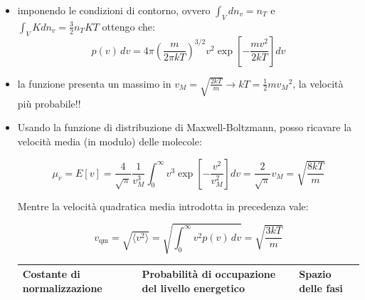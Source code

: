 \documentclass{article}
\theoremstyle{remark}
\begin{document}
\begin{itemize}
\begin{nota}
quindi per $\beta$ utilizzamo la definizone della media quadratica di tutte le velocità
\begin{align*}
    \langle v^2 \rangle &= \frac{1}{N} \int_0^\infty v^2 \, dn(v).
\end{align*}

Sostituendo l'espressione di \( dn(v) \), si ha

\begin{align*}
    \langle v^2 \rangle &= 4\pi A^3 \int_0^\infty v^4 \exp \left[ -\beta \left( \tfrac{1}{2} mv^2 \right) \right] dv
\end{align*}

Il cui valorè è:
$\frac{3}{m\beta}$

Dalle supposizioni abbiamo che l'unica energia è quella cinetica, dal teorema di equipartizione dell'energia, essendoci 3 gradi di libertà:

\[
    \tfrac{1}{2} m \langle w^2 \rangle = \tfrac{3}{2} k \theta \rightarrow \frac{1}{2} m \frac{3}{m\beta} = \frac{3}{2} k \theta,
\]
cioè

\begin{align*}
    \beta = \frac{1}{k \theta}.
\end{align*}
\end{nota} 
\item imponendo le condizioni di contorno, ovvero $\displaystyle \int_{V} dn_v=n_T$ e $\displaystyle \int_{V}K dn_v=\frac{3}{2}n_T K T$ ottengo che:
\[
p(v) \, dv = 4\pi \left( \frac{m}{2\pi kT} \right)^{3/2} v^2 \exp \left[ -\frac{mv^2}{2kT} \right] dv
\]
\item la funzione presenta un massimo in $v_M=\sqrt{\frac{2kT}{m}} \rightarrow kT= \frac{1}{2}m {v_M}^2$, la velocità più probabile!!
\item Usando la funzione di distribuzione di Maxwell-Boltzmann, posso ricavare la velocità media (in modulo) delle molecole:

\[
\mu_v = E[v] = \frac{4}{\sqrt{\pi}} \frac{1}{v_M^3} \int_0^\infty v^3 \exp\left[-\frac{v^2}{v_M^2}\right] dv = \frac{2}{\sqrt{\pi}} v_M = \sqrt{\frac{8kT}{m}}
\]

Mentre la velocità quadratica media introdotta in precedenza vale:

\[
v_{\text{qm}} = \sqrt{\langle v^2 \rangle} = \sqrt{\int_0^\infty v^2 p(v) \, dv} = \sqrt{\frac{3kT}{m}}
\]

\begin{tabular}{lll}
    \toprule
    Costante di normalizzazione & Probabilità di occupazione del livello energetico & Spazio delle fasi \\
    \midrule
    \end{tabular}


\end{itemize}
\end{document}
